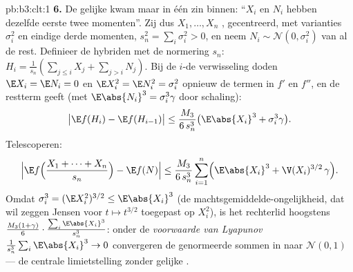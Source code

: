 \begin{solution}{pb:b3:clt:1}
\textbf{6.} De gelijke  kwam maar in één zin
binnen: ``$X_i$ en $N_i$ hebben dezelfde eerste twee
momenten''. Zij dus $X_1, \dots, X_n$ ,
gecentreerd, met varianties $\sigma_i^2$ en eindige derde
momenten, $s_n^2 = \sum_i\sigma_i^2 > 0$, en neem $N_i \sim
\mathcal N(0, \sigma_i^2)$  van al de rest.
Definieer de hybriden met de normering $s_n$: $H_i =
\frac1{s_n}(\sum_{j\leq i}X_j + \sum_{j>i}N_j)$. Bij de
$i$-de verwisseling doden $\E X_i = \E N_i = 0$ en $\E
X_i^2 = \E N_i^2 = \sigma_i^2$ opnieuw de termen in $f'$ en
$f''$, en de restterm geeft (met $\E\abs{N_i}^3 =
\sigma_i^3\gamma$ door schaling):
\[
\bigl|\E f(H_i) - \E f(H_{i-1})\bigr| \leq
\frac{M_3}{6\,s_n^3}\bigl(\E\abs{X_i}^3 +
\sigma_i^3\gamma\bigr) .
\]
Telescoperen:
\[
\Bigl|\E f\Bigl(\frac{X_1 + \dots + X_n}{s_n}\Bigr) -
\E f(N)\Bigr| \leq \frac{M_3}{6\,s_n^3}\sum_{i=1}^n
\Bigl(\E\abs{X_i}^3 + \V(X_i)^{3/2}\,\gamma\Bigr) .
\]
Omdat $\sigma_i^3 = (\E X_i^2)^{3/2} \leq \E\abs{X_i}^3$
(de machtsgemiddelde-ongelijkheid, dat wil zeggen Jensen
voor $t \mapsto t^{3/2}$ toegepast op $X_i^2$), is het
rechterlid hoogstens $\frac{M_3(1 + \gamma)}{6}\cdot
\frac{\sum_i\E\abs{X_i}^3}{s_n^3}$: onder de
\emph{voorwaarde van Lyapunov}
$\frac1{s_n^3}\sum_i\E\abs{X_i}^3 \to 0$ convergeren de
genormeerde sommen in  naar $\mathcal N(0,1)$ ---
de centrale limietstelling zonder gelijke .


\end{solution}
